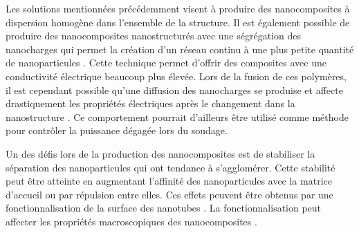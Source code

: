 Les solutions mentionnées précédemment visent à produire des nanocomposites à dispersion homogène dans l'ensemble de la structure. 
Il est également possible de produire des nanocomposites nanostructurés avec une ségrégation des nanocharges qui permet la création d'un réseau continu à une plus petite quantité de nanoparticules \cite{Al-Saleh2011, Li2015a, Deng2014a, Du2011a, Pang2014c, Jia2015}. 
Cette technique permet d'offrir des composites avec une conductivité électrique beaucoup plus élevée. 
Lors de la fusion de ces polymères, il est cependant possible qu'une diffusion des nanocharges se produise et affecte drastiquement les propriétés électriques après le changement dans la nanostructure \cite{Wu2012}. 
Ce comportement pourrait d'ailleurs être utilisé comme méthode pour contrôler la puissance dégagée lors du soudage. 

Un des défis lors de la production des nanocomposites est de stabiliser la séparation des nanoparticules qui ont tendance à s’agglomérer.
Cette stabilité peut être atteinte en augmentant l'affinité des nanoparticules avec la matrice d'accueil ou par répulsion entre elles. 
Ces effets peuvent être obtenus par une fonctionnalisation de la surface des nanotubes \cite{Xie2005}. 
La fonctionnalisation peut affecter les propriétés macroscopiques des nanocomposites \cite{Ma2008}. 


